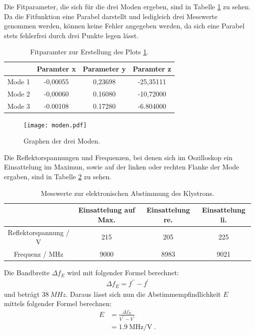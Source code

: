 \noindent Die Fitparameter, die sich für die drei Moden ergeben, sind in Tabelle
\ref{tab:Modenfit} zu sehen. Da die Fitfunktion eine Parabel darstellt und ledigleich
drei Messwerte genommen werden, können keine Fehler angegeben werden, da sich eine
Parabel stets fehlerfrei durch drei Punkte legen lässt.
\FloatBarrier
\begin{table}
    \centering
    \begin{tabular}{c c c c}
        \toprule
            {}    &  {Paramter x}  &  {Parameter y } &  {Paramter  z }\\
        \midrule
        Mode 1 &  -0,00055  &  0,23698  &  -25,35111          \\
        Mode 2 &  -0,00060  &  0.16080  &  -10,72000          \\
        Mode 3 &  -0.00108  &  0.17280  &  -6.804000          \\
        \bottomrule
    \end{tabular}
    \caption{Fitparamter zur Erstellung des Plots \ref{fig:Moden}.}
    \label{tab:Modenfit}
\end{table}
\FloatBarrier
\begin{figure}
  \centering
  \texttt{[image: moden.pdf]}
  \caption{Graphen der drei Moden.}
  \label{fig:Moden}
\end{figure}
Die Reflektorspannungen und Frequenzen, bei denen sich im Oszilloskop ein Einsattelung
im Maximun, sowie auf der linken oder rechten Flanke der Mode ergaben, sind in Tabelle
\ref{tab:elektronische_Abstimmung} zu sehen.
\FloatBarrier
\begin{table}
    \centering
    \begin{tabular}{c c c c}
        \toprule
        {}    & {Einsattelung auf Max.} & { Einsattelung re. } & {Einsattelung li.} \\
        \midrule
        Reflektorspannung / $\si{\V}$ & 215 & 205 & 225                           \\
        Frequenz / $\si{\MHz}$ & 9000 & 8983 & 9021                               \\
        \bottomrule
    \end{tabular}
    \caption{Messwerte zur elektronischen Abstimmung des Klystrons.}
    \label{tab:elektronische_Abstimmung}
\end{table}
\FloatBarrier
Die Bandbreite $\Delta f_{E}$ wird mit folgender Formel berechnet:
\begin{align*}
    \Delta f_E = f^{\prime\prime} - f^{\prime}
\end{align*}
\FloatBarrier
und beträgt $\SI{38}{MHz}$.
Daraus lässt sich nun die Abstimmempfindlichkeit $E$ mittels folgender Formel berechnen:
\begin{align*}
    E &= \frac{\Delta f_{E}}{V^{\prime \prime}-V^{\prime}} \\
      &= \SI{1,9}{\MHz \per \V} \;.
\end{align*}


